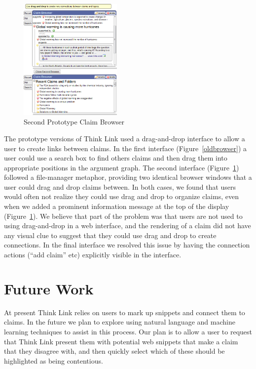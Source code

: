 \documentclass{chi2009}
\begin{document}
\begin{figure}[tb]
\begin{center}
	\includegraphics[width=5cm]{../screenshots/claimbrowse.png}
	\caption{Second Prototype Claim Browser}
	\label{secondbrowser}
\end{center}
\end{figure}

The prototype versions of Think Link used a drag-and-drop interface to allow a user to create links between claims. In the first interface (Figure~\ref{oldbrowser}) a user could use a search box to find others claims and then drag them into appropriate positions in the argument graph. The second interface (Figure~\ref{secondbrowser}) followed a file-manager metaphor, providing two identical browser windows that a user could drag and drop claims between. 
In both cases, we found that users would often not realize they could use drag and drop to organize claims, even when we added a prominent information message at the top of the display (Figure~\ref{secondbrowser}). We believe that part of the problem was that users are not used to using drag-and-drop in a web interface, and the rendering of a claim did not have any visual clue to suggest that they could use drag and drop to create connections. In the final interface we resolved this issue by having the connection actions (``add claim'' etc) explicitly visible in the interface.

\section{Future Work}

At present Think Link relies on users to mark up snippets and connect them to claims. In the future we plan to explore using natural language and machine learning techniques to assist in this process. Our plan is to allow a user to request that Think Link present them with potential web snippets that make a claim that they disagree with, and then quickly select which of these should be highlighted as being contentious.
\end{document}
